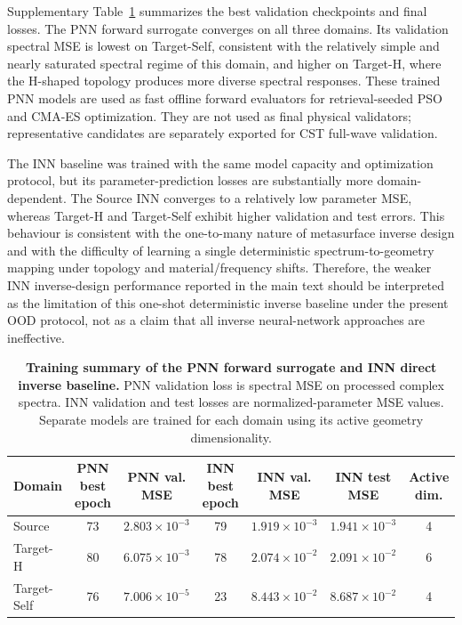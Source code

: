 \documentclass[final,1p,times]{elsarticle}
\begin{document}
Supplementary Table~\ref{tab:si_pnn_inn_training_summary} summarizes the best validation checkpoints and final losses. The PNN forward surrogate converges on all three domains. Its validation spectral MSE is lowest on Target-Self, consistent with the relatively simple and nearly saturated spectral regime of this domain, and higher on Target-H, where the H-shaped topology produces more diverse spectral responses. These trained PNN models are used as fast offline forward evaluators for retrieval-seeded PSO and CMA-ES optimization. They are not used as final physical validators; representative candidates are separately exported for CST full-wave validation.

The INN baseline was trained with the same model capacity and optimization protocol, but its parameter-prediction losses are substantially more domain-dependent. The Source INN converges to a relatively low parameter MSE, whereas Target-H and Target-Self exhibit higher validation and test errors. This behaviour is consistent with the one-to-many nature of metasurface inverse design and with the difficulty of learning a single deterministic spectrum-to-geometry mapping under topology and material/frequency shifts. Therefore, the weaker INN inverse-design performance reported in the main text should be interpreted as the limitation of this one-shot deterministic inverse baseline under the present OOD protocol, not as a claim that all inverse neural-network approaches are ineffective.

\begin{table}[htbp!]
\centering
\caption{\textbf{Training summary of the PNN forward surrogate and INN direct inverse baseline.}
PNN validation loss is spectral MSE on processed complex spectra. INN validation and test losses are normalized-parameter MSE values. Separate models are trained for each domain using its active geometry dimensionality.}
\label{tab:si_pnn_inn_training_summary}
\footnotesize
\setlength{\tabcolsep}{4.5pt}
\renewcommand{\arraystretch}{1.12}
\begin{tabular}{lcccccc}
\toprule
Domain & PNN best epoch & PNN val. MSE & INN best epoch & INN val. MSE & INN test MSE & Active dim. \\
\midrule
Source & 73 & $2.803\times10^{-3}$ & 79 & $1.919\times10^{-3}$ & $1.941\times10^{-3}$ & 4 \\
Target-H & 80 & $6.075\times10^{-3}$ & 78 & $2.074\times10^{-2}$ & $2.091\times10^{-2}$ & 6 \\
Target-Self & 76 & $7.006\times10^{-5}$ & 23 & $8.443\times10^{-2}$ & $8.687\times10^{-2}$ & 4 \\
\bottomrule
\end{tabular}
\end{table}
\end{document}
